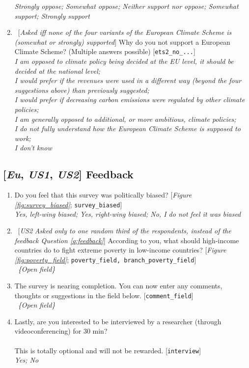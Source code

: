 \begin{enumerate}[resume]
    \textit{Strongly oppose; Somewhat oppose; Neither support nor oppose; Somewhat support; Strongly support}
    \item ~[\textit{Asked iff none of the four variants of the European Climate Scheme is (somewhat or strongly) supported}]  Why do you not support a European Climate Scheme? (Multiple answers possible) [\verb|ets2_no_...|]
    \\ \textit{I am opposed to climate policy being decided at the EU level, it should be decided at the national level; \\I would prefer if the revenues were used in a different way (beyond the four suggestions above) than previously suggested; \\I would prefer if decreasing carbon emissions were regulated by other climate policies; \\I am generally opposed to additional, or more ambitious, climate policies; \\I do not fully understand how the European Climate Scheme is supposed to work; \\I don't know}
\end{enumerate}

\subsection*{[\textit{Eu}, \textit{US1}, \textit{US2}] Feedback}
\begin{enumerate}[resume]
\item  \label{q:survey_biased} Do you feel that this survey was politically biased? [\textit{Figure \ref{fig:survey_biased}}; \verb|survey_biased|]
\\ \textit{Yes, left-wing biased; Yes, right-wing biased; No, I do not feel it was biased}
\item \label{q:poverty_field} ~[\textit{US2} \textit{Asked only to one random third of the respondents, instead of the feedback Question \ref{q:feedback}}]  According to you, what should high-income countries do to fight extreme poverty in low-income countries? [\textit{Figure \ref{fig:poverty_field}}; \verb|poverty_field, branch_poverty_field|]
\\ ~\textit{\{Open field\}}
\item  \label{q:feedback} The survey is nearing completion. You can now enter any comments, thoughts or suggestions in the field below. [\verb|comment_field|]
\\ ~\textit{\{Open field\}}
\item  Lastly, are you interested to be interviewed by a researcher (through videoconferencing) for 30 min? \\
\\
This is totally optional and will not be rewarded. [\verb|interview|]
\\ \textit{Yes; No}
\end{enumerate}
